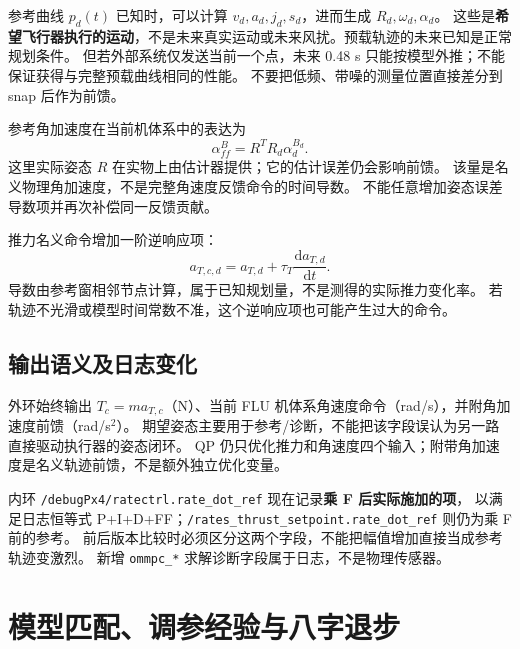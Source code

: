 \documentclass[UTF8,a4paper,11pt,fontset=fandol]{ctexart}
\newcommand{\code}[1]{{\small\nolinkurl{#1}}}
\begin{document}
参考曲线 $p_d(t)$ 已知时，可以计算 $v_d,a_d,j_d,s_d$，进而生成 $R_d,\omega_d,\alpha_d$。
这些是\textbf{希望飞行器执行的运动}，不是未来真实运动或未来风扰。预载轨迹的未来已知是正常规划条件。
但若外部系统仅发送当前一个点，未来 0.48 s 只能按模型外推；不能保证获得与完整预载曲线相同的性能。
不要把低频、带噪的测量位置直接差分到 snap 后作为前馈。

参考角加速度在当前机体系中的表达为
\begin{equation}
 \alpha_{ff}^{B}=R^T R_d\alpha_d^{B_d}.
\end{equation}
这里实际姿态 $R$ 在实物上由估计器提供；它的估计误差仍会影响前馈。
该量是名义物理角加速度，不是完整角速度反馈命令的时间导数。
不能任意增加姿态误差导数项并再次补偿同一反馈贡献。

推力名义命令增加一阶逆响应项：
\begin{equation}
 a_{T,c,d}=a_{T,d}+\tau_T\frac{\mathrm d a_{T,d}}{\mathrm dt}.
\end{equation}
导数由参考窗相邻节点计算，属于已知规划量，不是测得的实际推力变化率。
若轨迹不光滑或模型时间常数不准，这个逆响应项也可能产生过大的命令。

\subsection{输出语义及日志变化}
外环始终输出 $T_c=m a_{T,c}$（N）、当前 FLU 机体系角速度命令（rad/s），并附角加速度前馈（rad/s$^2$）。
期望姿态主要用于参考/诊断，不能把该字段误认为另一路直接驱动执行器的姿态闭环。
QP 仍只优化推力和角速度四个输入；附带角加速度是名义轨迹前馈，不是额外独立优化变量。

内环 \code{/debugPx4/ratectrl.rate_dot_ref} 现在记录\textbf{乘 F 后实际施加的项}，
以满足日志恒等式 P+I+D+FF；\code{/rates_thrust_setpoint.rate_dot_ref} 则仍为乘 F 前的参考。
前后版本比较时必须区分这两个字段，不能把幅值增加直接当成参考轨迹变激烈。
新增 \code{ommpc_*} 求解诊断字段属于日志，不是物理传感器。

\section{模型匹配、调参经验与八字退步}
\end{document}

